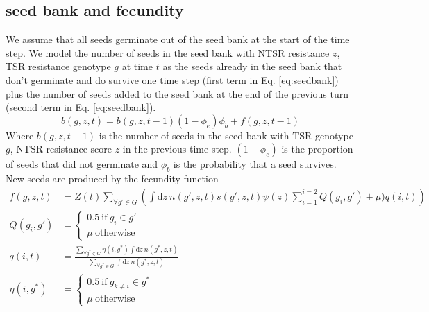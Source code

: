 \documentclass[12pt, a4paper]{article}
\begin{document}
\subsection{seed bank and fecundity}
We assume that all seeds germinate out of the seed bank at the start of the time step. We model the number of seeds in the seed bank with NTSR resistance $z$, TSR resistance genotype $g$ at time $t$ as the seeds already in the seed bank that don't germinate and do survive one time step (first term in Eq. \ref{eq:seedbank}) plus the number of seeds added to the seed bank at the end of the previous turn (second term in Eq. \ref{eq:seedbank}).
\begin{equation}\label{eq:seedbank}
	b(g, z, t) = b(g, z, t - 1)(1 - \phi_e)\phi_b + f(g, z, t - 1)  
\end{equation} 
Where $b(g, z, t - 1)$ is the number of seeds in the seed bank with TSR genotype $g$, NTSR resistance score $z$ in the previous time step. $(1 - \phi_e)$ is the proportion of seeds that did not germinate and $\phi_b$ is the probability that a seed survives. New seeds are produced by the fecundity function 
\begin{subequations}
\label{eq:fecund}
\begin{align}
	\displaystyle
	\label{eq:fecund_main}
	f(g, z, t) &= Z(t)\sum_{\forall g' \in G}\left(\int \text{d}z~n(g', z, t)s(g', z, t)\psi(z) \sum_{i = 1}^{i = 2} Q(g_i, g') + \mu)q(i, t)\right)\\
	\label{eq:fecund_maternal}
	Q(g_i, g') &= 
	\begin{cases}
		0.5 ~\text{if}~ g_i \in g' \\
		\mu ~\text{otherwise}
	\end{cases}\\
	\label{eq:fecund_pollen}
	q(i, t) &= \frac{\displaystyle\sum_{\forall g^* \in G} \eta(i, g^*) \int \text{d}z~n(g^*, z, t)}{\displaystyle \sum_{\forall g^* \in G} \int \text{d}z~n(g^*, z, t)}\\
	\label{eq:pollen_freq}
	\eta(i, g^*) &= 
	\begin{cases}
	0.5~\text{if}~g_{k \neq i} \in g^* \\
	\mu ~\text{otherwise}
	\end{cases}    
\end{align} 
\end{subequations}
\end{document}
